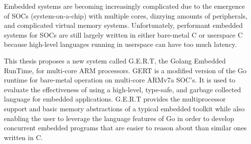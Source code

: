 % 
% 
%

Embedded systems are becoming increasingly complicated due to the emergence of
SOCs (system-on-a-chip) with multiple cores, dizzying amounts of peripherals, and
complicated virtual memory systems. Unfortunately, performant embedded systems
for SOCs are still largely written in either bare-metal C or userspace C because
high-level languages running in userspace can have too much latency.

This thesis proposes a new system called G.E.R.T, the Golang Embedded RunTime,
for multi-core ARM processors.
GERT is a modified version of the Go runtime for
bare-metal operation on multi-core ARMv7a SOC's. It is used to evaluate
the effectiveness of using a high-level, type-safe, and garbage collected
language for embedded applications. G.E.R.T
provides the multiprocessor support and basic memory abstractions of a
typical embedded toolkit while also enabling the user to leverage the language features
of Go in order to develop
concurrent embedded programs that are easier to reason about than similar ones
written in C.

